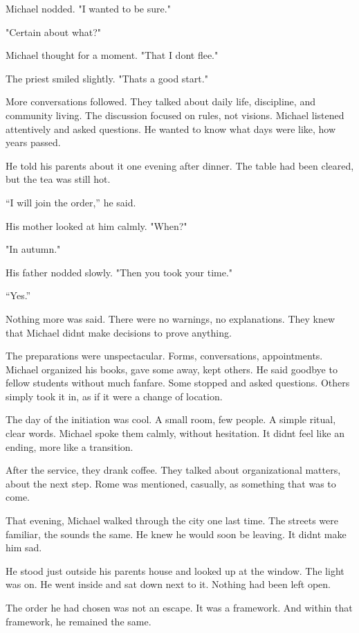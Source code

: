 \documentclass[
]{article}
\begin{document}
Michael nodded. "I wanted to be sure."

"Certain about what?"

Michael thought for a moment. "That I don\textquotesingle t flee."

The priest smiled slightly. "That\textquotesingle s a good start."

More conversations followed. They talked about daily life, discipline, and community living. The discussion focused on rules, not visions. Michael listened attentively and asked questions. He wanted to know what days were like, how years passed.

He told his parents about it one evening after dinner. The table had been cleared, but the tea was still hot.

``I will join the order,'' he said.

His mother looked at him calmly. "When?"

"In autumn."

His father nodded slowly. "Then you took your time."

``Yes.''

Nothing more was said. There were no warnings, no explanations. They knew that Michael didn\textquotesingle t make decisions to prove anything.

The preparations were unspectacular. Forms, conversations, appointments. Michael organized his books, gave some away, kept others. He said goodbye to fellow students without much fanfare. Some stopped and asked questions. Others simply took it in, as if it were a change of location.

The day of the initiation was cool. A small room, few people. A simple ritual, clear words. Michael spoke them calmly, without hesitation. It didn\textquotesingle t feel like an ending, more like a transition.

After the service, they drank coffee. They talked about organizational matters, about the next step. Rome was mentioned, casually, as something that was to come.

That evening, Michael walked through the city one last time. The streets were familiar, the sounds the same. He knew he would soon be leaving. It didn\textquotesingle t make him sad.

He stood just outside his parents\textquotesingle{} house and looked up at the window. The light was on. He went inside and sat down next to it. Nothing had been left open.

The order he had chosen was not an escape. It was a framework. And within that framework, he remained the same.
\end{document}
